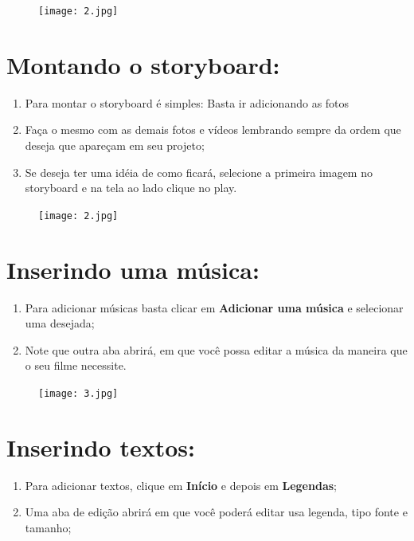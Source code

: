 \documentclass{article}
\begin{document}
{\begin{figure}[h!]
\centering
\texttt{[image: 2.jpg]}
\end{figure}

\newpage

\section{Montando o storyboard:}
\begin{enumerate}
\item Para montar o storyboard é simples: Basta ir adicionando as fotos
\item Faça o mesmo com as demais fotos e vídeos lembrando sempre da ordem que deseja que apareçam em seu projeto;
\item Se deseja ter uma idéia de como ficará, selecione a primeira imagem no storyboard e na tela ao lado clique no play.
\end{enumerate}

\begin{figure}[h!]
\centering
\texttt{[image: 2.jpg]}
\end{figure}

\newpage

\section{Inserindo uma música:}
\begin{enumerate}
\item Para adicionar músicas basta clicar em \textbf{Adicionar uma música} e selecionar
uma desejada;
\item Note que outra aba abrirá, em que você possa editar a música da maneira
que o seu filme necessite.
\end{enumerate}

\begin{figure}[h!]
\centering
\texttt{[image: 3.jpg]}
\end{figure}

\newpage

\section{Inserindo textos:}
\begin{enumerate}
\item Para adicionar textos, clique em \textbf{Início} e depois em \textbf{Legendas};
\item Uma aba de edição abrirá em que você poderá editar usa legenda, tipo fonte e tamanho;
\end{enumerate}

}
\end{document}
